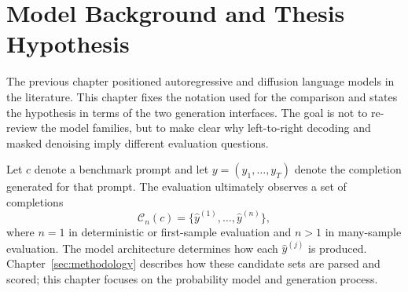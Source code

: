 \section{Model Background and Thesis Hypothesis}
\label{sec:model-background}

The previous chapter positioned autoregressive and diffusion language models in
the literature. This chapter fixes the notation used for the comparison and
states the hypothesis in terms of the two generation interfaces. The goal is
not to re-review the model families, but to make clear why left-to-right
decoding and masked denoising imply different evaluation questions.

Let $c$ denote a benchmark prompt and let $y=(y_1,\ldots,y_T)$ denote the
completion generated for that prompt. The evaluation ultimately observes a set
of completions
\begin{equation}
    \mathcal{C}_n(c)=\{\hat{y}^{(1)},\ldots,\hat{y}^{(n)}\},
\end{equation}
where $n=1$ in deterministic or first-sample evaluation and $n>1$ in
many-sample evaluation. The model architecture determines how each
$\hat{y}^{(j)}$ is produced. Chapter~\ref{sec:methodology} describes how these
candidate sets are parsed and scored; this chapter focuses on the probability
model and generation process.

